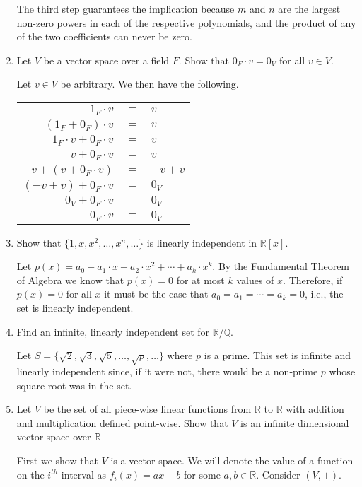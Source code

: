 \documentclass[12pt]{article}
\begin{document}
\begin{enumerate}
The third step guarantees the implication because $m$ and $n$ are the largest non-zero powers in each of the respective polynomials, and the product of any of the two coefficients can never be zero.

\item Let $V$ be a vector space over a field $F$.  Show that $0_F \cdot v = 0_V$ for all $v \in V$.

Let $v \in V$ be arbitrary.  We then have the following.

\begin{tabular}{rll}
	$1_F \cdot v$ & $=$ & $v$ \\
	$(1_F + 0_F) \cdot v$ & $=$ & $v$ \\
	$1_F \cdot v + 0_F \cdot v$ & $=$ & $v$ \\
	$v + 0_F \cdot v$ & $=$ & $v$ \\
	$-v + (v + 0_F \cdot v)$ & $=$ & $-v + v$ \\
	$(-v + v) + 0_F \cdot v$ & $=$ & $0_V$ \\
	$0_V + 0_F \cdot v$ & $=$ & $0_V$ \\
	$0_F \cdot v$ & $=$ & $0_V$
\end{tabular}

\item Show that $\{1,x,x^2, \ldots, x^n, \ldots\}$ is linearly independent in $\mathbb{R}[x]$.

Let $p(x) = a_0 + a_1 \cdot x + a_2 \cdot x^2 + \cdots + a_k \cdot x^k$.  By the Fundamental Theorem of Algebra we know that $p(x)=0$ for at most $k$ values of $x$.  Therefore, if $p(x)=0$ for all $x$ it must be the case that $a_0=a_1=\cdots=a_k=0$, i.e., the set is linearly independent.

\item Find an infinite, linearly independent set for $\mathbb{R}/\mathbb{Q}$.

Let $S = \{\sqrt{2}, \sqrt{3}, \sqrt{5}, \ldots, \sqrt{p}, \ldots\}$ where $p$ is a prime.  This set is infinite and linearly independent since, if it were not, there would be a non-prime $p$ whose square root was in the set.

\item Let $V$ be the set of all piece-wise linear functions from $\mathbb{R}$ to $\mathbb{R}$ with addition and multiplication defined point-wise.  Show that $V$ is an infinite dimensional vector space over $\mathbb{R}$

First we show that $V$ is a vector space.  We will denote the value of a function on the $i^{th}$ interval as $f_i(x) = ax + b$ for some $a,b \in \mathbb{R}$.  Consider $(V,+)$.


\end{enumerate}
\end{document}

